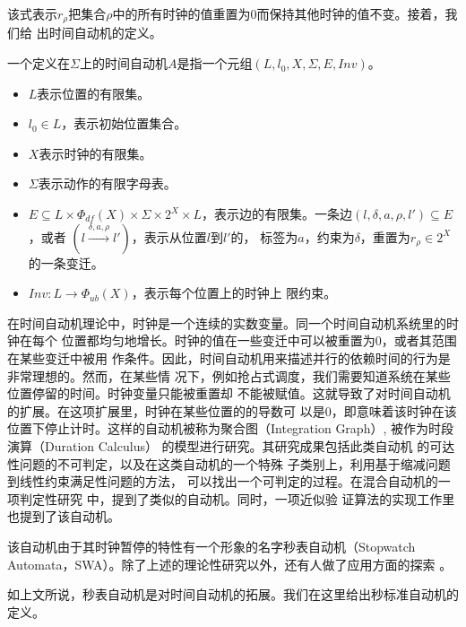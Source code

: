 该式表示$r_\rho$把集合$\rho$中的所有时钟的值重置为0而保持其他时钟的值不变。接着，我们给
出时间自动机的定义。

\begin{definition}
	\label{def:TA}
	一个定义在$\varSigma$上的时间自动机$A$是指一个元组$(L,l_0,X,\varSigma,E,
	Inv)$。
	\begin{itemize}
		\item $L$表示位置的有限集。
		\item $l_0\in L$，表示初始位置集合。
		\item $X$表示时钟的有限集。
		\item $\varSigma$表示动作的有限字母表。
		\item $E\subseteq L\times \varPhi_{df}(X)\times \varSigma \times 2^X
		\times L$，表示边的有限集。一条边$(l,\delta,a,\rho,l')\subseteq E$，或者
		$(l\stackrel{\delta,a,\rho}{\longrightarrow}l')$，表示从位置$l$到$l'$的，
		标签为$a$，约束为$\delta$，重置为$r_\rho \in 2^X$的一条变迁。
		\item $Inv:L\longrightarrow \varPhi_{ub}(X)$，表示每个位置上的时钟上
		限约束。
	\end{itemize}
\end{definition}

在时间自动机理论中，时钟是一个连续的实数变量。同一个时间自动机系统里的时钟在每个
位置都均匀地增长。时钟的值在一些变迁中可以被重置为0，或者其范围在某些变迁中被用
作条件。因此，时间自动机用来描述并行的依赖时间的行为是非常理想的。然而，在某些情
况下，例如抢占式调度，我们需要知道系统在某些位置停留的时间。时钟变量只能被重置却
不能被赋值。这就导致了对时间自动机的扩展。在这项扩展里，时钟在某些位置的的导数可
以是0，即意味着该时钟在该位置下停止计时。这样的自动机被称为聚合图（Integration
Graph）\cite{Kesten:1999:DIG:302392.302397}, 被作为时段演算（Duration Calculus）
\cite{DBLP:journals/ipl/ChaochenHR91}的模型进行研究。其研究成果包括此类自动机
的可达性问题的不可判定\cite{Alur04decisionproblems}，以及在这类自动机的一个特殊
子类别上，利用基于缩减问题到线性约束满足性问题的方法\cite{Apt:2003:PCP:1237975}，
可以找出一个可判定的过程。在混合自动机\cite{Henzinger96thetheory}的一项判定性研究
\cite{McManis:1994:SAD:647763.735660}中，提到了类似的自动机。同时，一项近似验
证算法的实现工作\cite{Cassez:2000:IPS:646735.701625}里也提到了该自动机。

该自动机由于其时钟暂停的特性有一个形象的名字\pozhehao 秒表自动机（Stopwatch
Automata，SWA）。除了上述的理论性研究以外，还有人做了应用方面的探索
\cite{Abdeddaim:2002:PJS:646486.694487}。

如上文所说，秒表自动机是对时间自动机的拓展。我们在这里给出秒标准自动机的定义。

